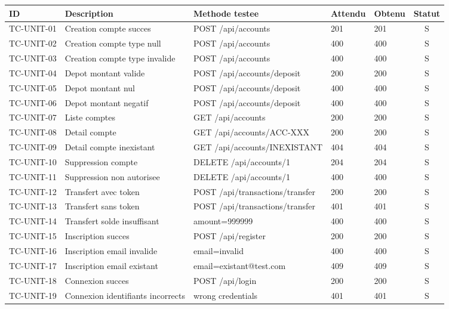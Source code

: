 \documentclass[12pt,a4paper]{article}
\begin{document}
\begin{longtable}{|p{2.2cm}|p{4cm}|p{3.5cm}|p{2.5cm}|p{2.5cm}|c|}
\hline
\rowcolor[gray]{0.9}
\textbf{ID} & \textbf{Description} & \textbf{Methode testee} & \textbf{Attendu} & \textbf{Obtenu} & \textbf{Statut} \\
\hline
TC-UNIT-01 & Creation compte succes & POST /api/accounts & 201 & 201 & S \\
\hline
TC-UNIT-02 & Creation compte type null & POST /api/accounts & 400 & 400 & S \\
\hline
TC-UNIT-03 & Creation compte type invalide & POST /api/accounts & 400 & 400 & S \\
\hline
TC-UNIT-04 & Depot montant valide & POST /api/accounts/deposit & 200 & 200 & S \\
\hline
TC-UNIT-05 & Depot montant nul & POST /api/accounts/deposit & 400 & 400 & S \\
\hline
TC-UNIT-06 & Depot montant negatif & POST /api/accounts/deposit & 400 & 400 & S \\
\hline
TC-UNIT-07 & Liste comptes & GET /api/accounts & 200 & 200 & S \\
\hline
TC-UNIT-08 & Detail compte & GET /api/accounts/ACC-XXX & 200 & 200 & S \\
\hline
TC-UNIT-09 & Detail compte inexistant & GET /api/accounts/INEXISTANT & 404 & 404 & S \\
\hline
TC-UNIT-10 & Suppression compte & DELETE /api/accounts/1 & 204 & 204 & S \\
\hline
TC-UNIT-11 & Suppression non autorisee & DELETE /api/accounts/1 & 400 & 400 & S \\
\hline
TC-UNIT-12 & Transfert avec token & POST /api/transactions/transfer & 200 & 200 & S \\
\hline
TC-UNIT-13 & Transfert sans token & POST /api/transactions/transfer & 401 & 401 & S \\
\hline
TC-UNIT-14 & Transfert solde insuffisant & amount=999999 & 400 & 400 & S \\
\hline
TC-UNIT-15 & Inscription succes & POST /api/register & 200 & 200 & S \\
\hline
TC-UNIT-16 & Inscription email invalide & email=invalid & 400 & 400 & S \\
\hline
TC-UNIT-17 & Inscription email existant & email=existant@test.com & 409 & 409 & S \\
\hline
TC-UNIT-18 & Connexion succes & POST /api/login & 200 & 200 & S \\
\hline
TC-UNIT-19 & Connexion identifiants incorrects & wrong credentials & 401 & 401 & S \\

\end{longtable}
\end{document}
